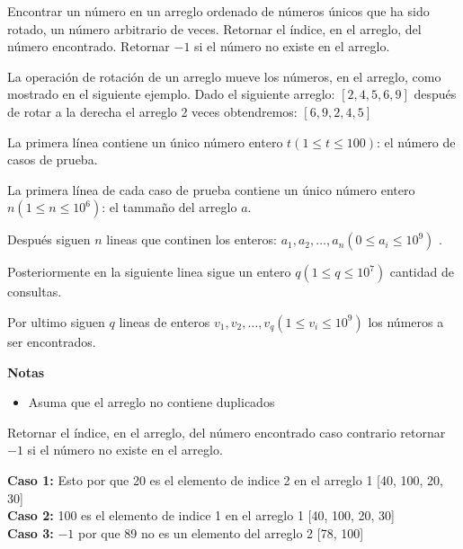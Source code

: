 
Encontrar un número en un arreglo ordenado de números únicos que ha sido rotado, un número arbitrario de veces.
Retornar el índice, en el arreglo, del número encontrado.
Retornar $-1$ si el número no existe en el arreglo.

La operación de rotación de un arreglo mueve los números, en el arreglo, como mostrado en el siguiente ejemplo.
Dado el siguiente arreglo: $[2, 4, 5, 6, 9]$
después de rotar a la derecha el arreglo 2 veces obtendremos: $[6, 9, 2, 4, 5]$
  

La primera línea contiene un único número entero $t (1 \leq t \leq 100)$: el número de casos de prueba.

La primera línea de cada caso de prueba contiene un único número entero $n (1 \leq n \leq 10^6)$: el tammaño del arreglo $a$.

Después siguen $n$ lineas que continen los enteros: $a_1,a_2,…,a_n (0 \leq a_i \leq 10^9)$ .

Posteriormente en la siguiente linea sigue un entero $q (1 \leq q \leq 10^7)$ cantidad de consultas.

Por ultimo siguen $q$ lineas de
enteros $v_1,v_2,…,v_q (1 \leq v_i \leq 10^9)$  los números a ser encontrados.

\textbf{Notas}
\begin{itemize}
    \item Asuma que el arreglo no contiene duplicados
\end{itemize}

\outputText

Retornar el índice, en el arreglo, del número encontrado caso contrario
retornar $-1$ si el número no existe en el arreglo.

\exampleCases

\begin{example}
\end{example}

\explanationText

\textbf{Caso 1: }
Esto por que 20 es el elemento de indice 2 en el arreglo 1 [40, 100, 20, 30]\\
\textbf{Caso 2: }
100 es el elemento de indice 1 en el arreglo 1 [40, 100, 20, 30]\\
\textbf{Caso 3: }
$-1$ por que 89 no es un elemento del arreglo 2 [78, 100]
